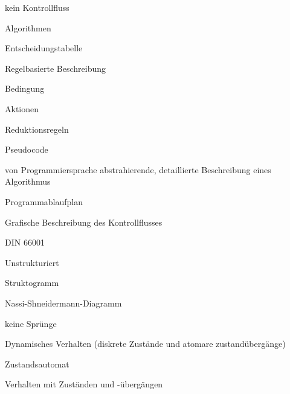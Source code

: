 \documentclass[a4paper]{article}
\begin{document}
\begin{multicols}{3}
\begin{itemize*}
\begin{itemize*}
\begin{itemize*}
                    \item kein Kontrollfluss
                  \end{itemize*}
          \end{itemize*}
    \item Algorithmen
          \begin{itemize*}
            \item Entscheidungstabelle
                  \begin{itemize*}
                    \item Regelbasierte Beschreibung
                    \item Bedingung
                    \item Aktionen
                    \item Reduktionsregeln
                  \end{itemize*}
            \item Pseudocode
                  \begin{itemize*}
                    \item von Programmiersprache abstrahierende, detaillierte Beschreibung eines Algorithmus
                  \end{itemize*}
            \item Programmablaufplan
                  \begin{itemize*}
                    \item Grafische Beschreibung des Kontrollflusses
                    \item DIN 66001
                    \item Unstrukturiert
                  \end{itemize*}
            \item Struktogramm
                  \begin{itemize*}
                    \item Nassi-Shneidermann-Diagramm
                    \item keine Sprünge
                  \end{itemize*}
          \end{itemize*}
    \item Dynamisches Verhalten (diskrete Zustände und atomare zustandübergänge)
          \begin{itemize*}
            \item Zustandsautomat
                  \begin{itemize*}
                    \item Verhalten mit Zuständen und -übergängen

\end{itemize*}
\end{itemize*}
\end{itemize*}
\end{multicols}
\end{document}
